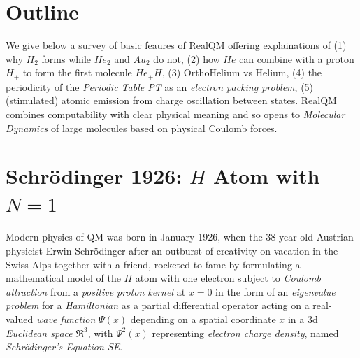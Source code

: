 \documentclass[11pt]{article} %
\begin{document}
\section{Outline}
We give below a survey of basic feaures of RealQM offering explainations of (1) why $H_2$ forms while $He_2$ and $Au_2$ do not,  (2) how $He$ can combine with a proton $H_+$ to form the first molecule $He_+H$,  (3) OrthoHelium vs Helium,  (4) the periodicity of the \emph{Periodic Table PT} as an \emph{electron packing problem},  (5) (stimulated) atomic emission from charge oscillation between states.  RealQM combines computability with clear physical meaning and so opens to \emph{Molecular Dynamics} of large molecules based on physical Coulomb forces.

 
\section{Schr\"odinger 1926: $H$ Atom with  $N=1$}

Modern physics of QM was born in January 1926,  when the 38 year old Austrian physicist Erwin Schr\"odinger after an outburst of creativity on vacation in the Swiss Alps together with a friend,  rocketed to fame by formulating a mathematical model of the $H$ atom with one electron subject to \emph{Coulomb attraction} from a \emph{positive proton kernel} at $x=0$ in the form of an \emph{eigenvalue problem} for a \emph{Hamiltonian} as a partial differential operator acting on a real-valued \emph{wave function} $\Psi (x)$ depending on a spatial coordinate $x$ in a 3d \emph{Euclidean space} $\Re^3$, with $\Psi^2(x)$ representing \emph{electron charge density},  named \emph{Schr\"odinger's Equation SE}. 
\end{document}
